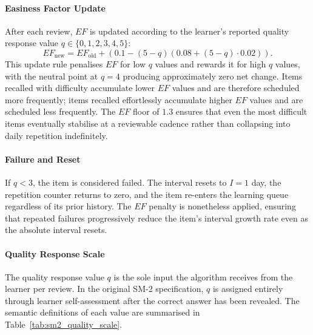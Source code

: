 \paragraph{Easiness Factor Update}
After each review, $EF$ is updated according to the learner's reported 
quality response value $q \in \{0, 1, 2, 3, 4, 5\}$:
\begin{equation}
    EF_{\text{new}} = EF_{\text{old}} + 
    \left(0.1 - (5 - q)\left(0.08 + (5 - q) \cdot 0.02\right)\right).
    \label{eq:sm2_ef_update}
\end{equation}
This update rule penalises $EF$ for low $q$ values and rewards it for high $q$ values, with the neutral point at $q = 4$ producing approximately zero net change. Items recalled with difficulty accumulate lower $EF$ values and are therefore scheduled more frequently; items recalled effortlessly accumulate higher $EF$ values and are scheduled less frequently. The $EF$ floor of $1.3$ ensures that even the most difficult items eventually stabilise at a reviewable cadence rather than collapsing into daily repetition indefinitely.

\paragraph{Failure and Reset}
If $q < 3$, the item is considered failed. The interval resets to $I = 1$ day, the repetition counter returns to zero, and the item re-enters the learning queue regardless of its prior history. The $EF$ penalty is nonetheless applied, ensuring that repeated failures progressively reduce the item's interval growth rate even as the absolute interval resets.

\paragraph{Quality Response Scale}
The quality response value $q$ is the sole input the algorithm receives from the learner per review. In the original SM-2 specification, $q$ is assigned entirely through learner self-assessment after the correct answer has been revealed. The semantic definitions of each value are summarised in Table~\ref{tab:sm2_quality_scale}.

